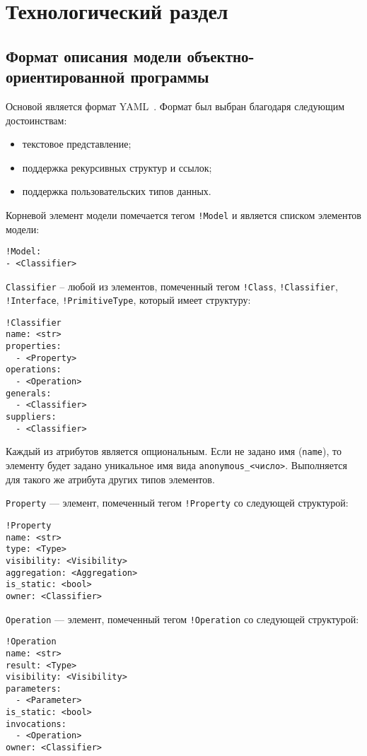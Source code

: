 \chapter{Технологический раздел}
\label{cha:implementation}

\section{Формат описания модели объектно-ориентированной программы}

Основой является формат YAML~\cite{YAML}.
Формат был выбран благодаря следующим достоинствам:
\begin{itemize}
\item текстовое представление;
\item поддержка рекурсивных структур и ссылок;
\item поддержка пользовательских типов данных.
\end{itemize}

Корневой элемент модели помечается тегом \verb;!Model; и является списком элементов
модели:
\begin{verbatim}
!Model:
- <Classifier>
\end{verbatim}

\verb;Classifier; -- любой из элементов, помеченный тегом \verb;!Class;,
\verb;!Classifier;, \verb;!Interface;, \verb;!PrimitiveType;,
который имеет структуру:
\begin{verbatim}
!Classifier
name: <str>
properties:
  - <Property>
operations:
  - <Operation>
generals:
  - <Classifier>
suppliers:
  - <Classifier>
\end{verbatim}

Каждый из атрибутов является опциональным.
Если не задано имя (\verb;name;), то элементу будет задано уникальное
имя вида \verb;anonymous_<число>;.
Выполняется для такого же атрибута других типов элементов.

\verb;Property; --- элемент, помеченный тегом \verb;!Property; со следующей
структурой:
\begin{verbatim}
!Property
name: <str>
type: <Type>
visibility: <Visibility>
aggregation: <Aggregation>
is_static: <bool>
owner: <Classifier>
\end{verbatim}

\verb;Operation; --- элемент, помеченный тегом \verb;!Operation; со следующей
структурой:
\begin{verbatim}
!Operation
name: <str>
result: <Type>
visibility: <Visibility>
parameters:
  - <Parameter>
is_static: <bool>
invocations:
  - <Operation>
owner: <Classifier>
\end{verbatim}

